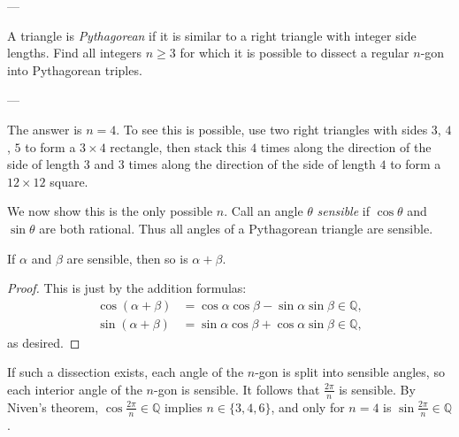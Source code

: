 
---

A triangle is \emph{Pythagorean} if it is similar to a right triangle with integer side lengths. Find all integers $n\ge3$ for which it is possible to dissect a regular $n$-gon into Pythagorean triples.

---

The answer is $n=4$. To see this is possible, use two right triangles with sides $3$, $4$, $5$ to form a $3\times4$ rectangle, then stack this $4$ times along the direction of the side of length $3$ and $3$ times along the direction of the side of length $4$ to form a $12\times12$ square.

We now show this is the only possible $n$. Call an angle $\theta$ \emph{sensible} if $\cos\theta$ and $\sin\theta$ are both rational. Thus all angles of a Pythagorean triangle are sensible.
\begin{iclaim*}
    If $\alpha$ and $\beta$ are sensible, then so is $\alpha+\beta$.
\end{iclaim*}
\begin{proof}
    This is just by the addition formulas:
    \begin{align*}
        \cos(\alpha+\beta)&=\cos\alpha\cos\beta-\sin\alpha\sin\beta\in\mathbb Q,\\
        \sin(\alpha+\beta)&=\sin\alpha\cos\beta+\cos\alpha\sin\beta\in\mathbb Q,
    \end{align*}
    as desired.
\end{proof}

If such a dissection exists, each angle of the $n$-gon is split into sensible angles, so each interior angle of the $n$-gon is sensible. It follows that $\tfrac{2\pi}n$ is sensible. By Niven's theorem, $\cos\tfrac{2\pi}n\in\mathbb Q$ implies $n\in\{3,4,6\}$, and only for $n=4$ is $\sin\tfrac{2\pi}n\in\mathbb Q$.

